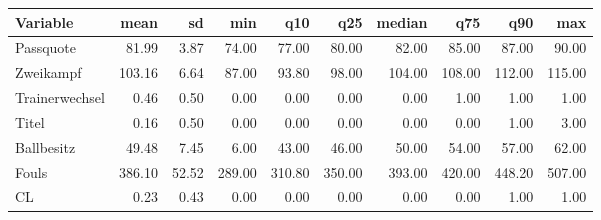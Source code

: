 \begin{table}[ht]
\centering
\begin{tabular}{lrrrrrrrrr}
  \hline
Variable & mean & sd & min & q10 & q25 & median & q75 & q90 & max \\ 
  \hline
Passquote & 81.99 & 3.87 & 74.00 & 77.00 & 80.00 & 82.00 & 85.00 & 87.00 & 90.00 \\ 
  Zweikampf & 103.16 & 6.64 & 87.00 & 93.80 & 98.00 & 104.00 & 108.00 & 112.00 & 115.00 \\ 
  Trainerwechsel & 0.46 & 0.50 & 0.00 & 0.00 & 0.00 & 0.00 & 1.00 & 1.00 & 1.00 \\ 
  Titel & 0.16 & 0.50 & 0.00 & 0.00 & 0.00 & 0.00 & 0.00 & 1.00 & 3.00 \\ 
  Ballbesitz & 49.48 & 7.45 & 6.00 & 43.00 & 46.00 & 50.00 & 54.00 & 57.00 & 62.00 \\ 
  Fouls & 386.10 & 52.52 & 289.00 & 310.80 & 350.00 & 393.00 & 420.00 & 448.20 & 507.00 \\ 
  CL & 0.23 & 0.43 & 0.00 & 0.00 & 0.00 & 0.00 & 0.00 & 1.00 & 1.00 \\ 
   \hline
\end{tabular}
\end{table}
